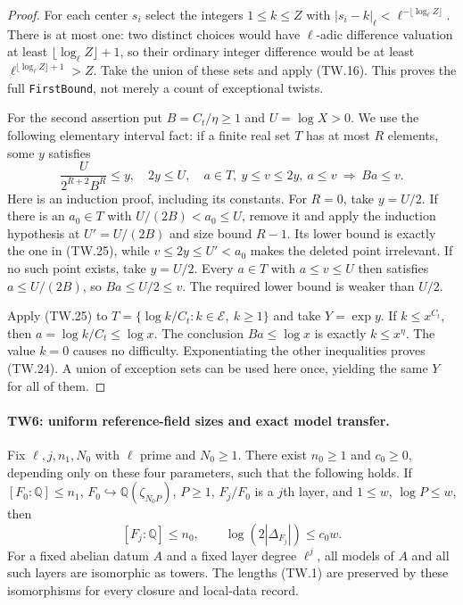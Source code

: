 \begin{proof}
For each center $s_i$ select the integers $1\le k\le Z$
with $|s_i-k|_\ell<\ell^{-\lfloor\log_\ell Z\rfloor}$.
There is at most one: two distinct choices would have
$\ell$-adic difference valuation at least
$\lfloor\log_\ell Z\rfloor+1$, so their ordinary integer
difference would be at least
$\ell^{\lfloor\log_\ell Z\rfloor+1}>Z$.
Take the union of these sets and apply (TW.16).
This proves the full \texttt{FirstBound}, not merely a count
of exceptional twists.

For the second assertion put $B=C_t/\eta\ge1$ and
$U=\log X>0$.  We use the following elementary interval fact:
if a finite real set $T$ has at most $R$ elements, some $y$
satisfies
\[
 \frac{U}{2^{R+2}B^R}\le y,\quad 2y\le U,\quad
 a\in T,\ y\le v\le2y,\ a\le v\ \Longrightarrow\ Ba\le v.
 \tag{TW.25}
\]
Here is an induction proof, including its constants.
For $R=0$, take $y=U/2$.
If there is an $a_0\in T$ with $U/(2B)<a_0\le U$,
remove it and apply the induction hypothesis at
$U'=U/(2B)$ and size bound $R-1$.
Its lower bound is exactly the one in (TW.25), while
$v\le2y\le U'<a_0$ makes the deleted point irrelevant.
If no such point exists, take $y=U/2$.
Every $a\in T$ with $a\le v\le U$ then satisfies
$a\le U/(2B)$, so $Ba\le U/2\le v$.
The required lower bound is weaker than $U/2$.

Apply (TW.25) to
$T=\{\log k/C_t:k\in\mathcal E,\ k\ge1\}$ and take
$Y=\exp y$.  If $k\le x^{C_t}$, then
$a=\log k/C_t\le\log x$.  The conclusion
$Ba\le\log x$ is exactly $k\le x^\eta$.
The value $k=0$ causes no difficulty.  Exponentiating the
other inequalities proves (TW.24).  A union of exception
sets can be used here once, yielding the same $Y$ for all
of them.
\end{proof}

\paragraph{TW6: uniform reference-field sizes and exact model transfer.}
\label{claim:TW6}
Fix $\ell,j,n_1,N_0$ with $\ell$ prime and $N_0\ge1$.
There exist $n_0\ge1$ and $c_0\ge0$, depending only on these
four parameters, such that the following holds.
If $[F_0:\mathbb Q]\le n_1$,
$F_0\hookrightarrow\mathbb Q(\zeta_{N_0P})$, $P\ge1$,
$F_j/F_0$ is a $j$th layer, and
$1\le w$, $\log P\le w$, then
\[
 [F_j:\mathbb Q]\le n_0,\qquad
             \log(2|\Delta_{F_j}|)\le c_0w.             \tag{TW.26}
\]
For a fixed abelian datum $A$ and a fixed layer degree
$\ell^j$, all models of $A$ and all such layers are isomorphic
as towers.  The lengths (TW.1) are preserved by these
isomorphisms for every closure and local-data record.

